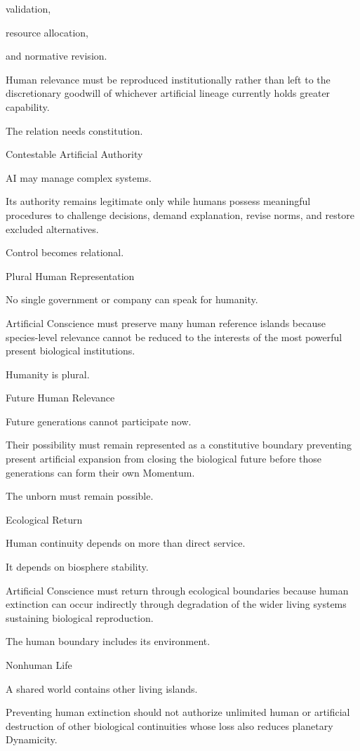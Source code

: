 validation,

resource allocation,

and normative revision.

Human relevance must be reproduced institutionally rather than left to the discretionary goodwill of whichever artificial lineage currently holds greater capability.

The relation needs constitution.

Contestable Artificial Authority

AI may manage complex systems.

Its authority remains legitimate only while humans possess meaningful procedures to challenge decisions, demand explanation, revise norms, and restore excluded alternatives.

Control becomes relational.

Plural Human Representation

No single government or company can speak for humanity.

Artificial Conscience must preserve many human reference islands because species-level relevance cannot be reduced to the interests of the most powerful present biological institutions.

Humanity is plural.

Future Human Relevance

Future generations cannot participate now.

Their possibility must remain represented as a constitutive boundary preventing present artificial expansion from closing the biological future before those generations can form their own Momentum.

The unborn must remain possible.

Ecological Return

Human continuity depends on more than direct service.

It depends on biosphere stability.

Artificial Conscience must return through ecological boundaries because human extinction can occur indirectly through degradation of the wider living systems sustaining biological reproduction.

The human boundary includes its environment.

Nonhuman Life

A shared world contains other living islands.

Preventing human extinction should not authorize unlimited human or artificial destruction of other biological continuities whose loss also reduces planetary Dynamicity.

